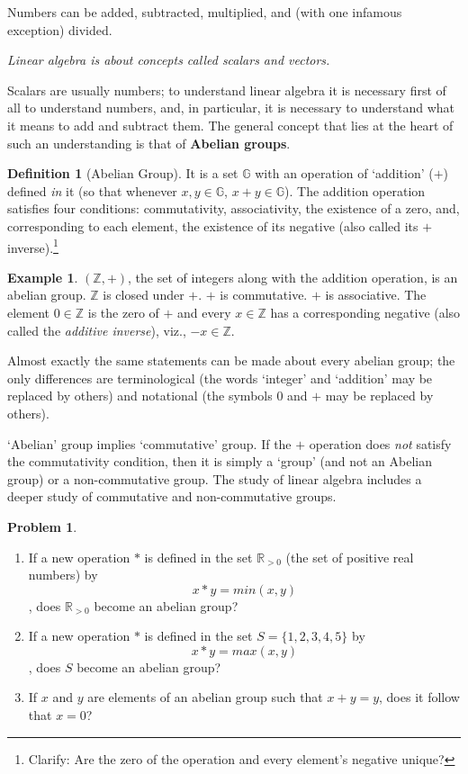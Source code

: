 \documentclass[english,notitlepage,smartquotes]{hgbreport}
\theoremstyle{definition}
\newtheorem{definition}{Definition}
\theoremstyle{definition}
\newtheorem{problem}{Problem}
\theoremstyle{remark}
\theoremstyle{definition}
\newtheorem{example}{Example}
\theoremstyle{plain}
\theoremstyle{definition}
\begin{document}
Numbers can be added, subtracted, multiplied, and (with one infamous exception) divided. 

\emph{Linear algebra is about concepts called scalars and vectors.}

Scalars are usually numbers; to understand linear algebra it is necessary first of all to understand numbers, and, in particular, it is necessary to understand what it means to add and subtract them. The general concept that lies at the heart of such an understanding is that of \textbf{Abelian groups}.

\begin{definition}[Abelian Group]
It is a set $\mathbb{G}$ with an operation of `addition' ($+$) defined \emph{in} it (so that whenever $x,y\in\mathbb{G}$, $x+y\in\mathbb{G}$). The addition operation satisfies four conditions: commutativity, associativity, the existence of a zero, and, corresponding to each element, the existence of its negative (also called its $+$ inverse).\footnote{Clarify: Are the zero of the operation and every element's negative unique?}
\end{definition}



\begin{example}
$(\mathbb{Z},+)$, the set of integers along with the addition operation, is an abelian group. $\mathbb{Z}$ is closed under $+$. $+$ is commutative. $+$ is associative. The element $0\in\mathbb{Z}$ is the zero of $+$ and every $x\in\mathbb{Z}$ has a corresponding negative (also called the \emph{additive inverse}), viz., $-x\in\mathbb{Z}$.
\end{example}

Almost exactly the same statements can be made about every abelian group; the only differences are terminological (the words `integer' and `addition' may be replaced by others) and notational (the symbols $0$ and $+$ may be replaced by others).


`Abelian' group implies `commutative' group. If the $+$ operation does \emph{not} satisfy the commutativity condition, then it is simply a `group' (and not an Abelian group) or a non-commutative group. The study of linear algebra includes a deeper study of commutative and non-commutative groups.

\begin{problem}
\label{pr:abelian}
\begin{enumerate}
\item If a new operation $*$ is defined in the set $\mathbb R_{> 0}$ (the set of positive real numbers) by
$$ 
x*y=min(x,y)
$$
, does $\mathbb R_{>0}$ become an abelian group?
\item If a new operation $*$ is defined in the set $S=\{1,2,3,4,5\}$ by
$$
x*y=max(x,y)
$$
, does $S$ become an abelian group?
\item\label{item:xyyx0p} If $x$ and $y$ are elements of an abelian group such that $x+y=y$, does it follow that $x = 0$?
\end{enumerate}

\end{problem}
\end{document}
